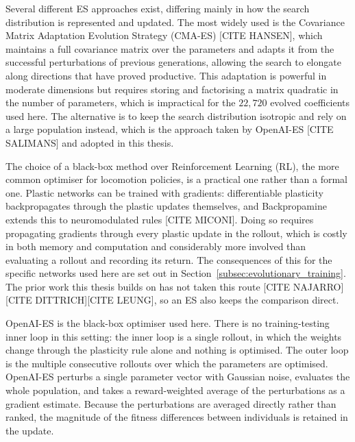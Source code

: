 \documentclass{article} %
\begin{document}
Several different ES approaches exist, differing mainly in how the search
distribution is represented and updated. The most widely used is the Covariance
Matrix Adaptation Evolution Strategy (CMA-ES) [CITE HANSEN], which maintains a
full covariance matrix over the parameters and adapts it from the successful
perturbations of previous generations, allowing the search to elongate along
directions that have proved productive. This adaptation is powerful in
moderate dimensions but requires storing and factorising a matrix quadratic in
the number of parameters, which is impractical for the $22{,}720$ evolved
coefficients used here. The alternative is to keep the search distribution
isotropic and rely on a large population instead, which is the approach taken
by OpenAI-ES [CITE SALIMANS] and adopted in this thesis.

The choice of a black-box method over Reinforcement Learning (RL), the more
common optimiser for locomotion policies, is a practical one rather than a
formal one. Plastic networks can be trained with gradients: differentiable
plasticity backpropagates through the plastic updates themselves, and
Backpropamine extends this to neuromodulated rules [CITE MICONI]. Doing so
requires propagating gradients through every plastic update in the rollout,
which is costly in both memory and computation and considerably more involved
than evaluating a rollout and recording its return. The consequences of this
for the specific networks used here are set out in
Section~\ref{subsec:evolutionary_training}. The prior work this thesis builds
on has not taken this route [CITE NAJARRO][CITE DITTRICH][CITE LEUNG], so an ES
also keeps the comparison direct.

OpenAI-ES is the black-box optimiser used here. There is no training-testing
inner loop in this setting: the inner loop is a single rollout, in which the
weights change through the plasticity rule alone and nothing is optimised. The
outer loop is the multiple consecutive rollouts over which the parameters are
optimised. OpenAI-ES perturbs a single parameter vector with Gaussian noise,
evaluates the whole population, and takes a reward-weighted average of the
perturbations as a gradient estimate. Because the perturbations are averaged
directly rather than ranked, the magnitude of the fitness differences between
individuals is retained in the update.
\end{document}
